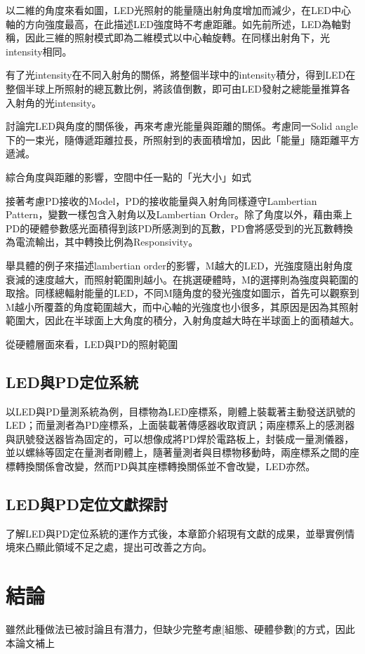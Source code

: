         以二維的角度來看如圖，LED光照射的能量隨出射角度增加而減少，在LED中心軸的方向強度最高，在此描述LED強度時不考慮距離。如先前所述，LED為軸對稱，因此三維的照射模式即為二維模式以中心軸旋轉。在同樣出射角下，光intensity相同。
        
        有了光intensity在不同入射角的關係，將整個半球中的intensity積分，得到LED在整個半球上所照射的總瓦數比例，將該值倒數，即可由LED發射之總能量推算各入射角的光intensity。
        
        討論完LED與角度的關係後，再來考慮光能量與距離的關係。考慮同一Solid angle下的一束光，隨傳遞距離拉長，所照射到的表面積增加，因此「能量」隨距離平方遞減。
        
        綜合角度與距離的影響，空間中任一點的「光大小」如式
        
        接著考慮PD接收的Model，PD的接收能量與入射角同樣遵守Lambertian Pattern，變數一樣包含入射角以及Lambertian Order。除了角度以外，藉由乘上PD的硬體參數感光面積得到該PD所感測到的瓦數，PD會將感受到的光瓦數轉換為電流輸出，其中轉換比例為Responsivity。
        
        舉具體的例子來描述lambertian order的影響，M越大的LED，光強度隨出射角度衰減的速度越大，而照射範圍則越小。在挑選硬體時，M的選擇則為強度與範圍的取捨。同樣總輻射能量的LED，不同M隨角度的發光強度如圖示，首先可以觀察到M越小所覆蓋的角度範圍越大，而中心軸的光強度也小很多，其原因是因為其照射範圍大，因此在半球面上大角度的積分，入射角度越大時在半球面上的面積越大。
        
        從硬體層面來看，LED與PD的照射範圍

    \subsection{LED與PD定位系統}

        以LED與PD量測系統為例，目標物為LED座標系，剛體上裝載著主動發送訊號的LED；而量測者為PD座標系，上面裝載著傳感器收取資訊；兩座標系上的感測器與訊號發送器皆為固定的，可以想像成將PD焊於電路板上，封裝成一量測儀器，並以螺絲等固定在量測者剛體上，隨著量測者與目標物移動時，兩座標系之間的座標轉換關係會改變，然而PD與其座標轉換關係並不會改變，LED亦然。

    \subsection{LED與PD定位文獻探討}

        了解LED與PD定位系統的運作方式後，本章節介紹現有文獻的成果，並舉實例情境來凸顯此領域不足之處，提出可改善之方向。

\section{結論}

雖然此種做法已被討論且有潛力，但缺少完整考慮[組態、硬體參數]的方式，因此本論文補上